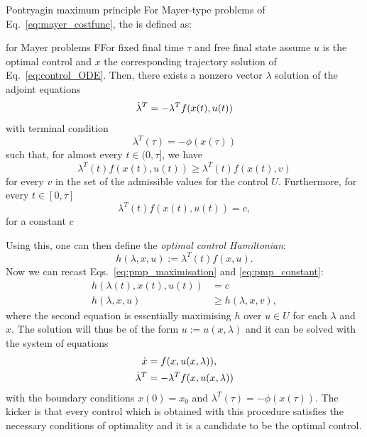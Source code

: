 \begin{mycolorbox}{Pontryagin maximum principle}
    For Mayer-type problems of Eq.~\eqref{eq:mayer_costfunc}, the  is defined as:
    \begin{theo}{{ for Mayer problems}}
        FFor fixed final time $\tau$ and free final state assume $u$ is the optimal control and $x$ the corresponding trajectory solution of Eq.~\eqref{eq:control_ODE}. Then, there exists a nonzero vector $\lambda$ solution of the adjoint equations
      \begin{equation}
          \dot{\lambda}^T = - \lambda^T f(x(t), u(t))
      \end{equation}
      with terminal condition
      \begin{equation}
          \lambda^T(\tau) = -\phi(x(\tau))
      \end{equation}
      such that, for almost every $t \in (0, \tau]$, we have
      \begin{equation}\label{eq:pmp_maximisation}
          \lambda^T(t) f(x(t), u(t)) \geq \lambda^T(t) f(x(t), v)
      \end{equation}
      for every $v$ in the set of the admissible values for the control $U$. Furthermore, for every $t \in [0, \tau]$
      \begin{equation}\label{eq:pmp_constant}
          \lambda^T(t) f(x(t), u(t)) = c,
      \end{equation}
      for a constant $c$
    \end{theo}
    Using this, one can then define the \emph{optimal control Hamiltonian}:
    \begin{equation}
        h(\lambda, x, u) := \lambda^T(t) f(x, u).
    \end{equation}
    Now we can recast Eqs.~\eqref{eq:pmp_maximisation} and \eqref{eq:pmp_constant}:
    \begin{equation}
        \begin{aligned}
            h(\lambda(t), x(t), u(t)) &= c \\
            h(\lambda, x, u) &\geq h(\lambda, x, v),
        \end{aligned}
    \end{equation}
    where the second equation is essentially maximising $h$ over $u \in U$ for each $\lambda$ and $x$. The solution will thus be of the form $u := u(x, \lambda)$ and it can be solved with the system of equations
    \begin{equation}
        \begin{aligned}
            \dot{x} &= f(x, u(x, \lambda)), \\
            \dot{\lambda}^T &= -\lambda^T f(x, u(x, \lambda))
        \end{aligned}
    \end{equation}
    with the boundary conditions $x(0) = x_0$ and $\lambda^T(\tau) = -\phi(x(\tau))$. The kicker is that every control which is obtained with this procedure satisfies the necessary conditions of optimality and it is a candidate to be the optimal control.
    
\end{mycolorbox}

